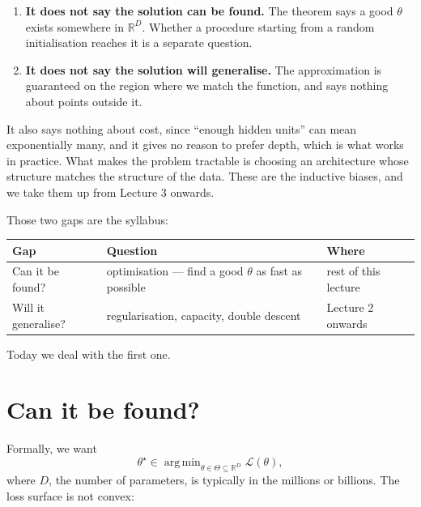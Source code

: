 \documentclass[11pt]{article}
\DeclareMathOperator*{\argmin}{arg\,min}
\newcommand{\R}{\mathbb{R}}
\newcommand{\Loss}{\mathcal{L}}
\begin{document}
\begin{asidebox}
\begin{enumerate}[label=\textbf{\arabic*.}]
  \item \textbf{It does not say the solution can be found.} The theorem says a good
  $\theta$ exists somewhere in $\R^D$. Whether a procedure starting from a random
  initialisation reaches it is a separate question.
  \item \textbf{It does not say the solution will generalise.} The approximation is
  guaranteed on the region where we match the function, and says nothing about points
  outside it.
\end{enumerate}
It also says nothing about cost, since ``enough hidden units'' can mean exponentially
many, and it gives no reason to prefer depth, which is what works in practice. What makes
the problem tractable is choosing an architecture whose structure matches the structure of
the data. These are the inductive biases, and we take them up from Lecture 3 onwards.
\end{asidebox}

\noindent
Those two gaps are the syllabus:

\begin{center}
\small
\begin{tabular}{@{}lll@{}}
\toprule
\textbf{Gap} & \textbf{Question} & \textbf{Where} \\
\midrule
Can it be found? & optimisation --- find a good $\theta$ as fast as possible & rest of this lecture \\
Will it generalise? & regularisation, capacity, double descent & Lecture 2 onwards \\
\bottomrule
\end{tabular}
\end{center}

\noindent
Today we deal with the first one.

\section{Can it be found?}
\label{sec:found}

Formally, we want
%
\[
  \theta^{\star} \in \argmin_{\theta \in \Theta \subseteq \R^{D}} \Loss(\theta),
\]
%
where $D$, the number of parameters, is typically in the millions or billions. The loss
surface is not convex:
\end{document}
